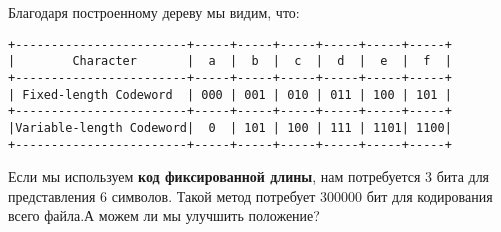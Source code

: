\newpage
Благодаря построенному дереву мы видим, что:

\vspace{\baselineskip}
\begin{tcolorbox}
\begin{verbatim}
+------------------------+-----+-----+-----+-----+-----+-----+
|        Character       |  a  |  b  |  c  |  d  |  e  |  f  |
+------------------------+-----+-----+-----+-----+-----+-----+
| Fixed-length Codeword  | 000 | 001 | 010 | 011 | 100 | 101 |
+------------------------+-----+-----+-----+-----+-----+-----+
|Variable-length Codeword|  0  | 101 | 100 | 111 | 1101| 1100|
+------------------------+-----+-----+-----+-----+-----+-----+
\end{verbatim}
\end{tcolorbox}

\vspace{\baselineskip} Если мы используем \textbf{код фиксированной длины}, нам потребуется 3 бита для представления 6 символов. Такой метод потребует 300000 бит для кодирования всего файла.А можем ли мы улучшить положение?